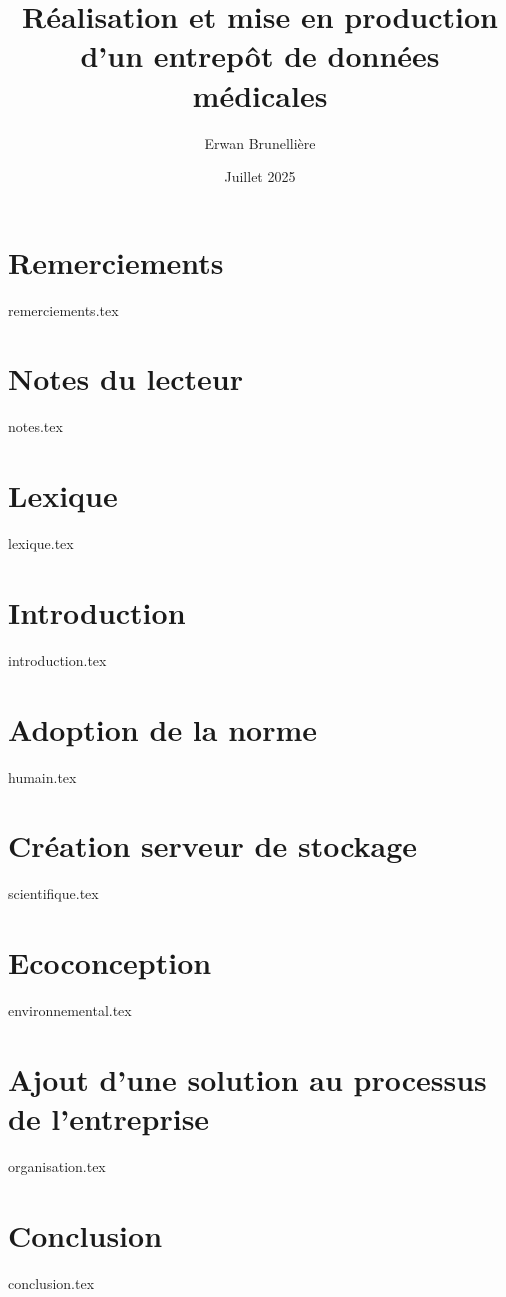 \documentclass[11pt]{memoireStyle}
\title{Réalisation et mise en production d'un entrepôt de données médicales}
\author{Erwan Brunellière}
\affil{IDIA 2025}
\affil{Polytech Nantes}
\date{Juillet 2025}
\begin{document}
\frontPage

\setStyle

\chapter*{Remerciements}
{remerciements.tex}

\chapter*{Notes du lecteur}
{notes.tex}

\chapter*{Lexique}
{lexique.tex}


\chapter{Introduction}
{introduction.tex}

\chapter{Adoption de la norme}
{humain.tex}

\chapter{Création serveur de stockage}
{scientifique.tex}

\chapter{Ecoconception}
{environnemental.tex}

\chapter{Ajout d'une solution au processus de l'entreprise}
{organisation.tex}


\chapter{Conclusion}
{conclusion.tex}
\end{document}
